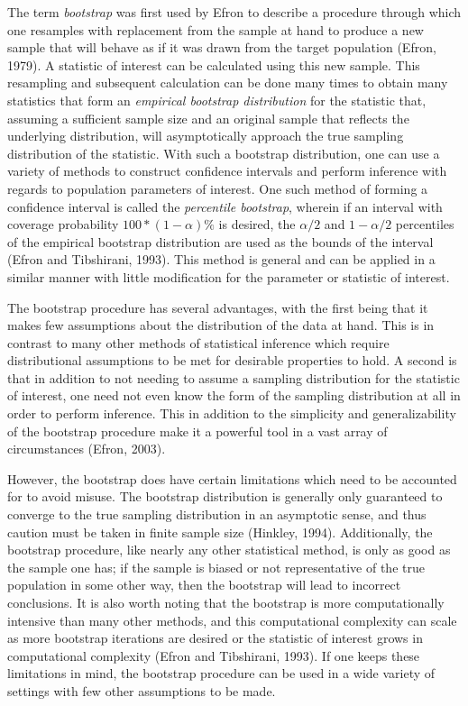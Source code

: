 		The term \textit{bootstrap} was first used by Efron to describe a procedure through which one resamples with replacement from the sample at hand to produce a new sample that will behave as if it
		was drawn from the target population (Efron, 1979). A statistic of interest can be calculated using this new sample. This resampling and subsequent calculation can be done many times to obtain many statistics that form an
		\textit{empirical bootstrap distribution} for the statistic that, assuming a sufficient sample size and an original sample that reflects the underlying distribution, will asymptotically approach the
		true sampling distribution of the statistic. With such a bootstrap distribution, one can use a variety of methods to construct confidence intervals and perform inference with regards to population
		parameters of interest. One such method of forming a confidence interval is called the \textit{percentile bootstrap}, wherein if an interval with coverage probability $100*(1-\alpha) \%$ is
		desired, the $\alpha/2$ and $1-\alpha/2$ percentiles of the empirical bootstrap distribution are used as the bounds of the interval (Efron and Tibshirani, 1993). This method is general and
		can be applied in a similar manner with little modification for the parameter or statistic of interest.

		The bootstrap procedure has several advantages, with the first being that it makes few assumptions about the distribution of the data at hand. This is in contrast to many other methods of
		statistical inference which require distributional assumptions to be met for desirable properties to hold. A second is that in addition to not needing to assume a sampling distribution for the statistic
		of interest, one need not even know the form of the sampling distribution at all in order to perform inference. This in addition to the simplicity and generalizability of the bootstrap procedure
		make it a powerful tool in a vast array of circumstances  (Efron, 2003).

		However, the bootstrap does have certain limitations which need to be accounted for to avoid misuse. The bootstrap distribution is generally only guaranteed to converge to the true sampling
		distribution in an asymptotic sense, and thus caution must be taken in finite sample size (Hinkley, 1994). Additionally, the bootstrap procedure, like nearly any other statistical method,
		is only as good as the sample one has; if the sample is biased or not representative of the true population in some other way, then the bootstrap will lead to incorrect conclusions. It is also
		worth noting that the bootstrap is more computationally intensive than many other methods, and this computational complexity can scale as more bootstrap iterations are desired or the statistic
		of interest grows in computational complexity (Efron and Tibshirani, 1993). If one keeps these limitations in mind, the bootstrap procedure can be used in a wide variety of settings with few
		other assumptions to be made.

